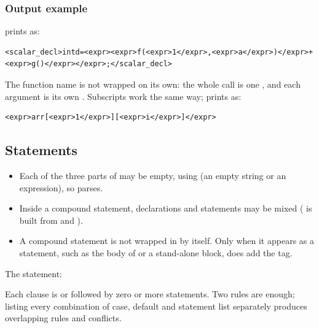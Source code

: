 \documentclass[12pt]{article}
\begin{document}
\subsubsection{Output example}

 prints as:

\begin{lstlisting}[language={},numbers=none]
<scalar_decl>intd=<expr><expr>f(<expr>1</expr>,<expr>a</expr>)</expr>+<expr>g()</expr></expr>;</scalar_decl>
\end{lstlisting}

The function name is not wrapped on its own: the whole call is one , and each argument is
its own . Subscripts work the same way;  prints as:

\begin{lstlisting}[language={},numbers=none]
<expr>arr[<expr>1</expr>][<expr>i</expr>]</expr>
\end{lstlisting}

\subsection{Statements}


\begin{itemize}
  \item Each of the three parts of  may be empty, using  (an empty string or an
        expression), so  parses.
  \item Inside a compound statement, declarations and statements may be mixed ( is built from
         and ).
  \item A compound statement is not wrapped in  by itself. Only when it appears as a statement,
        such as the body of  or a stand-alone block, does  add the tag.
\end{itemize}

The  statement:


Each clause is  or  followed by zero or more statements. Two rules
are enough; listing every combination of case, default and statement list separately produces
overlapping rules and conflicts.
\end{document}
